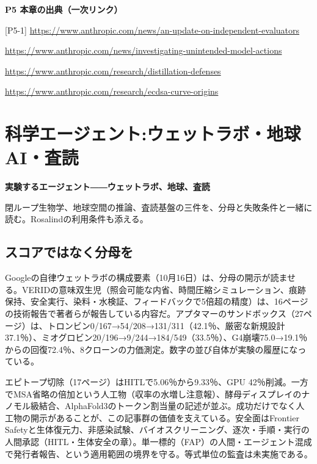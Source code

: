 \documentclass[lualatex,a4paper,10pt]{jlreq}
\begin{document}
\begin{tcolorbox}[colback=white,colframe=SurveyRule,arc=1mm,boxrule=0.4pt,left=2mm,right=2mm]
\textbf{P5 本章の出典（一次リンク）}\par\footnotesize
[P5-1] \url{https://www.anthropic.com/news/an-update-on-independent-evaluators}\par
[P5-2] \url{https://www.anthropic.com/news/investigating-unintended-model-actions}\par
[P5-3] \url{https://www.anthropic.com/research/distillation-defenses}\par
[P5-4] \url{https://www.anthropic.com/research/ecdsa-curve-origins}\par
\end{tcolorbox}

\section{科学エージェント:ウェットラボ・地球AI・査読}
\label{sec:P6}

{\Large\bfseries 実験するエージェント――ウェットラボ、地球、査読\par}
\smallskip
{\color{SurveyMuted}閉ループ生物学、地球空間の推論、査読基盤の三件を、分母と失敗条件と一緒に読む。Rosalindの利用条件も添える。\par}
\bigskip

\subsection*{スコアではなく分母を}
Googleの自律ウェットラボの構成要素（10月16日）は、分母の開示が読ませる。VERIDの意味双生児（照会可能な内省、時間圧縮シミュレーション、痕跡保持、安全実行、染料・水検証、フィードバックで5倍超の精度）は、16ページの技術報告で著者らが報告している内容だ。アプタマーのサンドボックス（27ページ）は、トロンビン0/167→54/208→131/311（42.1％、厳密な新規設計37.1％）、ミオグロビン20/196→9/244→184/549（33.5％）、G4崩壊75.0→19.1％からの回復72.4％、8クローンの力価測定。数字の並び自体が実験の履歴になっている。

エピトープ切除（17ページ）はHITLで5.06％から9.33％、GPU 42％削減。一方でMSA省略の倍加という人工物（収率の水増し注意報）、酵母ディスプレイのナノモル級結合、AlphaFold3のトークン割当量の記述が並ぶ。成功だけでなく人工物の開示があることが、この記事群の価値を支えている。安全面はFrontier Safetyと生体復元力、非感染試験、バイオスクリーニング、逐次・手順・実行の人間承認（HITL・生体安全の章）。単一標的（FAP）の人間・エージェント混成で発行者報告、という適用範囲の境界を守る。等式単位の監査は未実施である。
\end{document}
